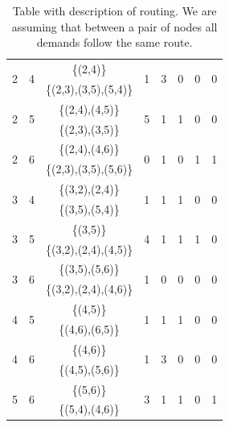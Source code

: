 \begin{table}[h!]
\begin{tabular}{|| c | c | c | c | c | c | c | c ||}
 \multirow{2}{*}{2} & \multirow{2}{*}{4} & \{(2,4)\} & \multirow{2}{*}{1} & \multirow{2}{*}{3} & \multirow{2}{*}{0} & \multirow{2}{*}{0} & \multirow{2}{*}{0}\\
 & & \{(2,3),(3,5),(5,4)\} & & & & &\\ \hline
 \multirow{2}{*}{2} & \multirow{2}{*}{5} & \{(2,4),(4,5)\} & \multirow{2}{*}{5} & \multirow{2}{*}{1} & \multirow{2}{*}{1} & \multirow{2}{*}{0} & \multirow{2}{*}{0}\\
 & & \{(2,3),(3,5)\} & & & & &\\ \hline
 \multirow{2}{*}{2} & \multirow{2}{*}{6} & \{(2,4),(4,6)\} & \multirow{2}{*}{0} & \multirow{2}{*}{1} & \multirow{2}{*}{0} & \multirow{2}{*}{1} & \multirow{2}{*}{1}\\
 & & \{(2,3),(3,5),(5,6)\} & & & & &\\ \hline
 \multirow{2}{*}{3} & \multirow{2}{*}{4} & \{(3,2),(2,4)\} & \multirow{2}{*}{1} & \multirow{2}{*}{1} & \multirow{2}{*}{1} & \multirow{2}{*}{0} & \multirow{2}{*}{0}\\
 & & \{(3,5),(5,4)\} & & & & &\\ \hline
 \multirow{2}{*}{3} & \multirow{2}{*}{5} & \{(3,5)\} & \multirow{2}{*}{4} & \multirow{2}{*}{1} & \multirow{2}{*}{1} & \multirow{2}{*}{1} & \multirow{2}{*}{0}\\
 & & \{(3,2),(2,4),(4,5)\} & & & & &\\ \hline
 \multirow{2}{*}{3} & \multirow{2}{*}{6} & \{(3,5),(5,6)\} & \multirow{2}{*}{1} & \multirow{2}{*}{0} & \multirow{2}{*}{0} & \multirow{2}{*}{0} & \multirow{2}{*}{0}\\
 & & \{(3,2),(2,4),(4,6)\} & & & & &\\ \hline
 \multirow{2}{*}{4} & \multirow{2}{*}{5} & \{(4,5)\} & \multirow{2}{*}{1} & \multirow{2}{*}{1} & \multirow{2}{*}{1} & \multirow{2}{*}{0} & \multirow{2}{*}{0}\\
 & & \{(4,6),(6,5)\} & & & & &\\ \hline
 \multirow{2}{*}{4} & \multirow{2}{*}{6} & \{(4,6)\} & \multirow{2}{*}{1} & \multirow{2}{*}{3} & \multirow{2}{*}{0} & \multirow{2}{*}{0} & \multirow{2}{*}{0}\\
 & & \{(4,5),(5,6)\} & & & & &\\ \hline
 \multirow{2}{*}{5} & \multirow{2}{*}{6} & \{(5,6)\} & \multirow{2}{*}{3} & \multirow{2}{*}{1} & \multirow{2}{*}{1} & \multirow{2}{*}{0} & \multirow{2}{*}{1}\\
 & & \{(5,4),(4,6)\} & & & & &\\
 \hline
\end{tabular}
\caption{Table with description of routing. We are assuming that between a pair of nodes all demands follow the same route.}
\label{path_opaque_protec_ref_medium}
\end{table}


